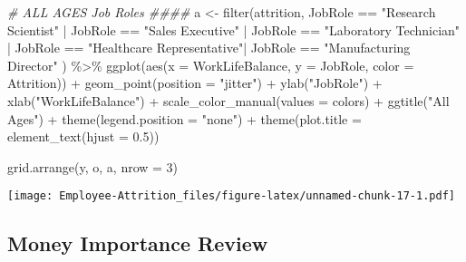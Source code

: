 \documentclass[
]{article}
\newenvironment{Shaded}{\begin{snugshade}}{\end{snugshade}}
\newcommand{\AttributeTok}[1]{\textcolor[rgb]{0.77,0.63,0.00}{#1}}
\newcommand{\CommentTok}[1]{\textcolor[rgb]{0.56,0.35,0.01}{\textit{#1}}}
\newcommand{\DecValTok}[1]{\textcolor[rgb]{0.00,0.00,0.81}{#1}}
\newcommand{\FloatTok}[1]{\textcolor[rgb]{0.00,0.00,0.81}{#1}}
\newcommand{\FunctionTok}[1]{\textcolor[rgb]{0.00,0.00,0.00}{#1}}
\newcommand{\NormalTok}[1]{#1}
\newcommand{\OtherTok}[1]{\textcolor[rgb]{0.56,0.35,0.01}{#1}}
\newcommand{\SpecialCharTok}[1]{\textcolor[rgb]{0.00,0.00,0.00}{#1}}
\newcommand{\StringTok}[1]{\textcolor[rgb]{0.31,0.60,0.02}{#1}}
\begin{document}
\begin{Shaded}
\begin{Highlighting}[]
\CommentTok{\# ALL AGES Job Roles \#\#\#\#}
\NormalTok{a }\OtherTok{\textless{}{-}} \FunctionTok{filter}\NormalTok{(attrition, JobRole }\SpecialCharTok{==} \StringTok{"Research Scientist"} \SpecialCharTok{|}\NormalTok{ JobRole }\SpecialCharTok{==} \StringTok{"Sales Executive"}  \SpecialCharTok{|}\NormalTok{ JobRole }\SpecialCharTok{==} \StringTok{"Laboratory Technician"} \SpecialCharTok{|}\NormalTok{ JobRole }\SpecialCharTok{==} \StringTok{"Healthcare Representative"}\SpecialCharTok{|}\NormalTok{ JobRole }\SpecialCharTok{==} \StringTok{"Manufacturing Director"}\NormalTok{ ) }\SpecialCharTok{\%\textgreater{}\%}
  \FunctionTok{ggplot}\NormalTok{(}\FunctionTok{aes}\NormalTok{(}\AttributeTok{x =}\NormalTok{ WorkLifeBalance, }\AttributeTok{y =}\NormalTok{ JobRole, }\AttributeTok{color =}\NormalTok{ Attrition)) }\SpecialCharTok{+}
  \FunctionTok{geom\_point}\NormalTok{(}\AttributeTok{position =} \StringTok{"jitter"}\NormalTok{) }\SpecialCharTok{+}
  \FunctionTok{ylab}\NormalTok{(}\StringTok{"JobRole"}\NormalTok{) }\SpecialCharTok{+}
  \FunctionTok{xlab}\NormalTok{(}\StringTok{"WorkLifeBalance"}\NormalTok{) }\SpecialCharTok{+}
  \FunctionTok{scale\_color\_manual}\NormalTok{(}\AttributeTok{values =}\NormalTok{ colors) }\SpecialCharTok{+}
  \FunctionTok{ggtitle}\NormalTok{(}\StringTok{"All Ages"}\NormalTok{) }\SpecialCharTok{+}
  \FunctionTok{theme}\NormalTok{(}\AttributeTok{legend.position =} \StringTok{"none"}\NormalTok{) }\SpecialCharTok{+}
  \FunctionTok{theme}\NormalTok{(}\AttributeTok{plot.title =} \FunctionTok{element\_text}\NormalTok{(}\AttributeTok{hjust =} \FloatTok{0.5}\NormalTok{)) }

\FunctionTok{grid.arrange}\NormalTok{(y, o, a, }\AttributeTok{nrow =} \DecValTok{3}\NormalTok{)}
\end{Highlighting}
\end{Shaded}

\texttt{[image: Employee-Attrition\_files/figure-latex/unnamed-chunk-17-1.pdf]}

\hypertarget{money-importance-review}{%
\subsection{Money Importance Review}\label{money-importance-review}}
\end{document}
